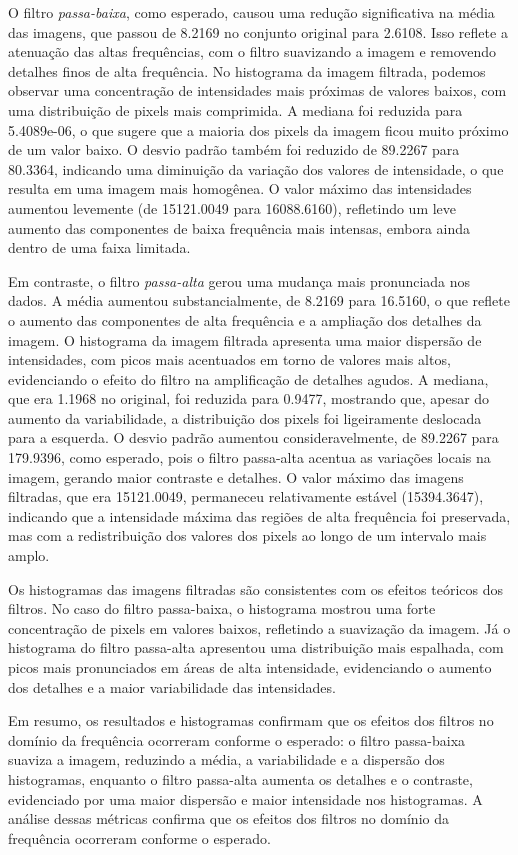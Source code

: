 \documentclass[a4paper, 11pt]{article}
\begin{document}
O filtro \textit{passa-baixa}, como esperado, causou uma redução significativa na média das imagens, que passou de 8.2169 no conjunto original para 2.6108. Isso reflete a atenuação das altas frequências, com o filtro suavizando a imagem e removendo detalhes finos de alta frequência. No histograma da imagem filtrada, podemos observar uma concentração de intensidades mais próximas de valores baixos, com uma distribuição de pixels mais comprimida. A mediana foi reduzida para 5.4089e-06, o que sugere que a maioria dos pixels da imagem ficou muito próximo de um valor baixo. O desvio padrão também foi reduzido de 89.2267 para 80.3364, indicando uma diminuição da variação dos valores de intensidade, o que resulta em uma imagem mais homogênea. O valor máximo das intensidades aumentou levemente (de 15121.0049 para 16088.6160), refletindo um leve aumento das componentes de baixa frequência mais intensas, embora ainda dentro de uma faixa limitada.

Em contraste, o filtro \textit{passa-alta} gerou uma mudança mais pronunciada nos dados. A média aumentou substancialmente, de 8.2169 para 16.5160, o que reflete o aumento das componentes de alta frequência e a ampliação dos detalhes da imagem. O histograma da imagem filtrada apresenta uma maior dispersão de intensidades, com picos mais acentuados em torno de valores mais altos, evidenciando o efeito do filtro na amplificação de detalhes agudos. A mediana, que era 1.1968 no original, foi reduzida para 0.9477, mostrando que, apesar do aumento da variabilidade, a distribuição dos pixels foi ligeiramente deslocada para a esquerda. O desvio padrão aumentou consideravelmente, de 89.2267 para 179.9396, como esperado, pois o filtro passa-alta acentua as variações locais na imagem, gerando maior contraste e detalhes. O valor máximo das imagens filtradas, que era 15121.0049, permaneceu relativamente estável (15394.3647), indicando que a intensidade máxima das regiões de alta frequência foi preservada, mas com a redistribuição dos valores dos pixels ao longo de um intervalo mais amplo.

Os histogramas das imagens filtradas são consistentes com os efeitos teóricos dos filtros. No caso do filtro passa-baixa, o histograma mostrou uma forte concentração de pixels em valores baixos, refletindo a suavização da imagem. Já o histograma do filtro passa-alta apresentou uma distribuição mais espalhada, com picos mais pronunciados em áreas de alta intensidade, evidenciando o aumento dos detalhes e a maior variabilidade das intensidades.

Em resumo, os resultados e histogramas confirmam que os efeitos dos filtros no domínio da frequência ocorreram conforme o esperado: o filtro passa-baixa suaviza a imagem, reduzindo a média, a variabilidade e a dispersão dos histogramas, enquanto o filtro passa-alta aumenta os detalhes e o contraste, evidenciado por uma maior dispersão e maior intensidade nos histogramas. A análise dessas métricas confirma que os efeitos dos filtros no domínio da frequência ocorreram conforme o esperado.

\newpage
 
\end{document}

